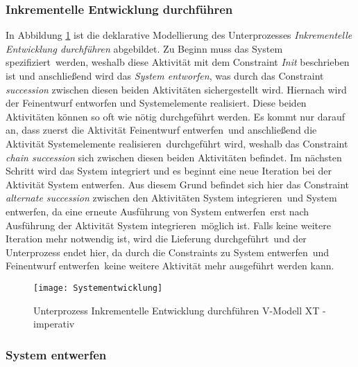 {\subsubsection{Inkrementelle Entwicklung durchführen}
In Abbildung \ref{fig:Systementwicklung} ist die deklarative Modellierung des Unterprozesses \textit{Inkrementelle Entwicklung durchführen} abgebildet. \newline
Zu Beginn muss das \grqq System spezifiziert\grqq \ werden, weshalb diese Aktivität mit dem Constraint \textit{Init} beschrieben ist und anschließend wird das \textit{System entworfen}, was durch das Constraint \textit{succession} zwischen diesen beiden Aktivitäten sichergestellt wird.\newline
Hiernach wird der Feinentwurf entworfen und Systemelemente realisiert. Diese beiden Aktivitäten können so oft wie nötig durchgeführt werden. Es kommt nur darauf an, dass zuerst die Aktivität \grqq Feinentwurf entwerfen\grqq \ und anschließend die Aktivität \grqq Systemelemente realisieren\grqq \ durchgeführt wird, weshalb das Constraint \textit{chain succession} sich zwischen diesen beiden Aktivitäten befindet. \newline
Im nächsten Schritt wird das System integriert und es beginnt eine neue Iteration bei der Aktivität System entwerfen. Aus diesem Grund befindet sich hier das Constraint \textit{alternate succession} zwischen den Aktivitäten \grqq System integrieren\grqq \ und \grqq System entwerfen\grqq, da eine erneute Ausführung von \grqq System entwerfen\grqq \ erst nach Ausführung der Aktivität \grqq System integrieren\grqq \ möglich ist. \newline
Falls keine weitere Iteration mehr notwendig ist, wird die \grqq Lieferung durchgeführt\grqq \ und der Unterprozess endet hier, da durch die Constraints zu \grqq System entwerfen\grqq \ und \grqq Feinentwurf entwerfen\grqq \ keine weitere Aktivität mehr ausgeführt werden kann. \newline
\begin{figure}[!htbp]
\begin{center}
  \texttt{[image: Systementwicklung]} %
  \caption{Unterprozess Inkrementelle Entwicklung durchführen V-Modell XT - imperativ}
  \label{fig:Systementwicklung}
\end{center}
\end{figure}



\subsubsection{System entwerfen}


}
